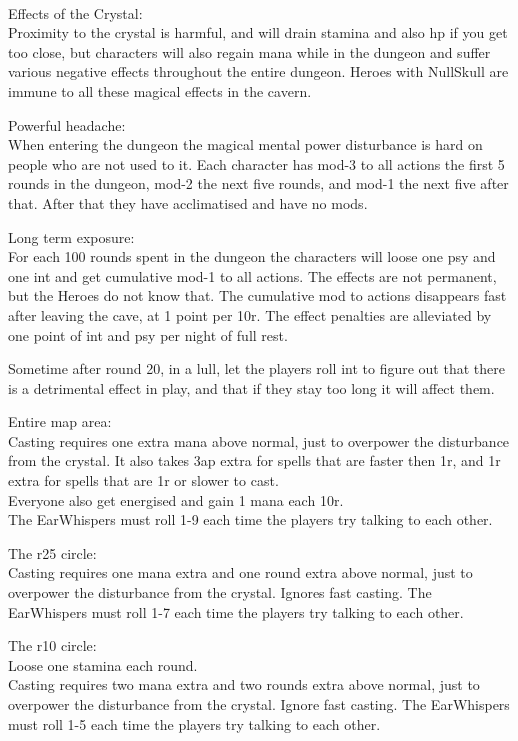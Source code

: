 \

Effects of the Crystal:\\
Proximity to the crystal is harmful, and will drain stamina and also hp if you get too close, but characters will also regain mana while in the dungeon and suffer various negative effects throughout the entire dungeon.
Heroes with NullSkull are immune to all these magical effects in the cavern.

Powerful headache:\\
When entering the dungeon the magical mental power disturbance is hard on people who are not used to it. Each character has mod-3 to all actions the first 5 rounds in the dungeon, mod-2 the next five rounds, and mod-1 the next five after that. After that they have acclimatised and have no mods.

Long term exposure:\\
For each 100 rounds spent in the dungeon the characters will loose one psy and one int and get cumulative mod-1 to all actions. The effects are not permanent, but the Heroes do not know that. The cumulative mod to actions disappears fast after leaving the cave, at 1 point per 10r. The effect penalties are alleviated by one point of int and psy per night of full rest.

Sometime after round 20, in a lull, let the players roll int to figure out that there is a detrimental effect in play, and that if they stay too long it will affect them.

Entire map area:\\
Casting requires one extra mana above normal, just to overpower the disturbance from the crystal. It also takes 3ap extra for spells that are faster then 1r, and 1r extra for spells that are 1r or slower to cast.\\
Everyone also get energised and gain 1 mana each 10r.\\
The EarWhispers must roll 1-9 each time the players try talking to each other.

The r25 circle:\\
Casting requires one mana extra and one round extra above normal, just to overpower the disturbance from the crystal. Ignores fast casting.
The EarWhispers must roll 1-7 each time the players try talking to each other.

The r10 circle:\\
Loose one stamina each round.\\
Casting requires two mana extra and two rounds extra above normal, just to
overpower the disturbance from the crystal. Ignore fast casting.
The EarWhispers must roll 1-5 each time the players try talking to each other.

